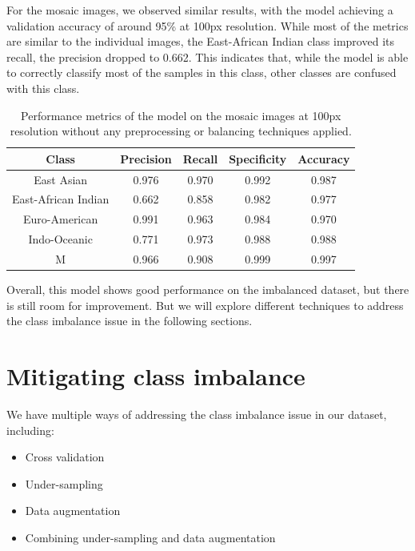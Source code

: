 For the mosaic images, we observed similar results, with the model achieving a validation accuracy of around 95\% at 100px resolution. While most of the metrics
are similar to the individual images, the East-African Indian class improved its recall, the precision dropped to 0.662. This indicates that, while the model is able to
correctly classify most of the samples in this class, other classes are confused with this class.

\begin{table}
	\centering
	\begin{tabular}{|c|c|c|c|c|}
		\hline
		\textbf{Class}      & \textbf{Precision} & \textbf{Recall} & \textbf{Specificity} & \textbf{Accuracy} \\
		\hline
		East Asian          & 0.976              & 0.970           & 0.992                & 0.987             \\
		East-African Indian & 0.662              & 0.858           & 0.982                & 0.977             \\
		Euro-American       & 0.991              & 0.963           & 0.984                & 0.970             \\
		Indo-Oceanic        & 0.771              & 0.973           & 0.988                & 0.988             \\
		M                   & 0.966              & 0.908           & 0.999                & 0.997             \\
		\hline
	\end{tabular}
	\caption{Performance metrics of the model on the mosaic images at 100px resolution without any preprocessing or balancing techniques applied.}
	\label{tab:performance_metrics_mosaic_std}
\end{table}

Overall, this model shows good performance on the imbalanced dataset, but there is still room for improvement. But we will explore different techniques
to address the class imbalance issue in the following sections.

\section{Mitigating class imbalance}
\label{sec:mitigating_class_imbalance}

We have multiple ways of addressing the class imbalance issue in our dataset, including:

\begin{itemize}
	\item Cross validation
	\item Under-sampling
	\item Data augmentation
	\item Combining under-sampling and data augmentation
\end{itemize}

